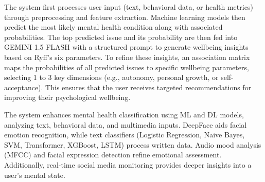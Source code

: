 \noindent
The system first processes user input (text, behavioral data, or health metrics) through preprocessing and feature extraction. Machine learning models then predict the most likely mental health condition along with associated probabilities. The top predicted issue and its probability are then fed into GEMINI 1.5 FLASH with a structured prompt to generate wellbeing insights based on Ryff’s six parameters. To refine these insights, an association matrix maps the probabilities of all predicted issues to specific wellbeing parameters, selecting 1 to 3 key dimensions (e.g., autonomy, personal growth, or self-acceptance). This ensures that the user receives targeted recommendations for improving their psychological wellbeing.

\vspace{1em}

\noindent
The system enhances mental health classification using ML and DL models, analyzing text, behavioral data, and multimedia inputs. DeepFace aids facial emotion recognition, while text classifiers (Logistic Regression, Naive Bayes, SVM, Transformer, XGBoost, LSTM) process written data. Audio mood analysis (MFCC) and facial expression detection refine emotional assessment. Additionally, real-time social media monitoring provides deeper insights into a user’s mental state.

\pagebreak










